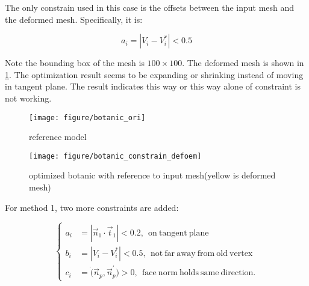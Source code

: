 The only constrain used in this case is the offsets between the input mesh and the deformed mesh. Specifically, it is:

\begin{equation*}
a_i = |V_i - V_i^*| < 0.5
\end{equation*}

Note the bounding box of the mesh is $ 100 \times 100 $. The deformed mesh is shown in \ref{fig:botanicconstraindefoem}. The optimization result seems to be expanding or shrinking instead of moving in tangent plane. The result indicates this way or this way alone of constraint is not working.

\begin{figure}[htbp]
	\centering
	\begin{minipage}{0.4\textwidth}
		\centering
		\texttt{[image: figure/botanic\_ori]}
		\caption{reference model}\label{fig:botanicori}
	\end{minipage}
	\begin{minipage}{0.4\textwidth}
		\centering
		\texttt{[image: figure/botanic\_constrain\_defoem]}
		\caption{optimized botanic with reference to input mesh(yellow is deformed mesh)}\label{fig:botanicconstraindefoem}
	\end{minipage}
	\vspace{\baselineskip}
\end{figure}

For method 1, two more constraints are added:

\begin{equation*}
\begin{cases}
	a_i & = |\vec{n}_1 \cdot \vec{t}_1| < 0.2,~~ \mathrm{on~tangent~plane} \\
	b_i &= |V_i - V_i^*| < 0.5,~~\mathrm{not~far~away~from~old~vertex} \\
	c_i &= \dot( \vec{n}_p, \vec{n}_p^{'}) > 0,~~\mathrm{face~norm~holds~same~direction.}	
\end{cases}
\end{equation*}

